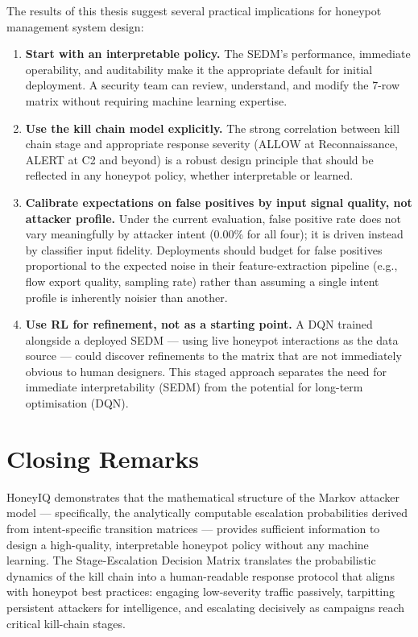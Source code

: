 The results of this thesis suggest several practical implications for
honeypot management system design:

\begin{enumerate}
  \item \textbf{Start with an interpretable policy.}
        The SEDM's performance, immediate operability, and auditability make
        it the appropriate default for initial deployment.
        A security team can review, understand, and modify the 7-row matrix
        without requiring machine learning expertise.

  \item \textbf{Use the kill chain model explicitly.}
        The strong correlation between kill chain stage and appropriate
        response severity (ALLOW at Reconnaissance, ALERT at C2 and beyond)
        is a robust design principle that should be reflected in any honeypot
        policy, whether interpretable or learned.

  \item \textbf{Calibrate expectations on false positives by input signal
        quality, not attacker profile.}
        Under the current evaluation, false positive rate does not vary
        meaningfully by attacker intent (0.00\% for all four); it is driven
        instead by classifier input fidelity.
        Deployments should budget for false positives proportional to the
        expected noise in their feature-extraction pipeline (e.g., flow
        export quality, sampling rate) rather than assuming a single intent
        profile is inherently noisier than another.

  \item \textbf{Use RL for refinement, not as a starting point.}
        A DQN trained alongside a deployed SEDM --- using live honeypot
        interactions as the data source --- could discover refinements to the
        matrix that are not immediately obvious to human designers.
        This staged approach separates the need for immediate interpretability
        (SEDM) from the potential for long-term optimisation (DQN).
\end{enumerate}

\section{Closing Remarks}

HoneyIQ demonstrates that the mathematical structure of the Markov attacker
model --- specifically, the analytically computable escalation probabilities
derived from intent-specific transition matrices --- provides sufficient
information to design a high-quality, interpretable honeypot policy without
any machine learning.
The Stage-Escalation Decision Matrix translates the probabilistic dynamics
of the kill chain into a human-readable response protocol that aligns with
honeypot best practices: engaging low-severity traffic passively, tarpitting
persistent attackers for intelligence, and escalating decisively as campaigns
reach critical kill-chain stages.


